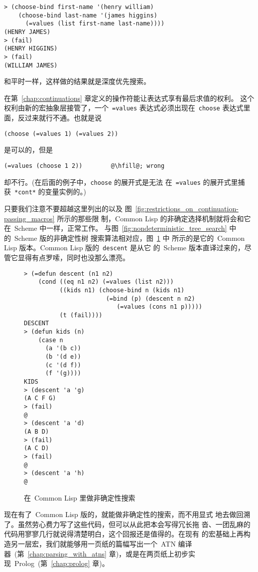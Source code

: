 \begin{lstlisting}
> (choose-bind first-name '(henry william)
    (choose-bind last-name '(james higgins)
      (=values (list first-name last-name))))
(HENRY JAMES)
> (fail)
(HENRY HIGGINS)
> (fail)
(WILLIAM JAMES)
\end{lstlisting}
和平时一样，这样做的结果就是深度优先搜索。

在第~\ref{chap:continuations} 章定义的操作符能让表达式享有最后求值的权利。
这个权利由新的宏抽象层接管了，一个~\texttt{=values} 表达式必须出现在~\texttt{choose} 表达式里面，反过来就行不通。也就是说
\begin{lstlisting}
(choose (=values 1) (=values 2))
\end{lstlisting}
是可以的，但是
\begin{lstlisting}[escapechar=\@]
(=values (choose 1 2))        @\hfill@; wrong
\end{lstlisting}
却不行。(在后面的例子中，\texttt{choose} 的展开式是无法
在~\texttt{=values} 的展开式里捕获~\texttt{*cont*} 的变量实例的。)

只要我们注意不要超越这里列出的以及
图~\ref{fig:restrictions_on_continuation-passing_macros} 所示的那些限
制，Common Lisp 的非确定选择机制就将会和它在~Scheme 中一样，正常工作。
与图~\ref{fig:nondeterministic_tree_search} 中的~Scheme 版的非确定性树
搜索算法相对应，图~\ref{fig:nondeterministic_search_in_common_lisp} 中
所示的是它的~Common Lisp 版本。Common Lisp 版的~\texttt{descent} 是从它
的~Scheme 版本直译过来的，尽管它显得有点罗嗦，同时也没那么漂亮。

\begin{figure}
\begin{lstlisting}
> (=defun descent (n1 n2)
    (cond ((eq n1 n2) (=values (list n2)))
          ((kids n1) (choose-bind n (kids n1)
                       (=bind (p) (descent n n2)
                          (=values (cons n1 p)))))
          (t (fail))))
DESCENT
> (defun kids (n)
    (case n
      (a '(b c))
      (b '(d e))
      (c '(d f))
      (f '(g))))
KIDS
> (descent 'a 'g)
(A C F G)
> (fail)
@
> (descent 'a 'd)
(A B D)
> (fail)
(A C D)
> (fail)
@
> (descent 'a 'h)
@
\end{lstlisting}
\caption{在~Common Lisp 里做非确定性搜索}
\label{fig:nondeterministic_search_in_common_lisp}
\end{figure}

现在有了~Common Lisp 版的\utility，就能做非确定性的搜索，而不用显式
地去做回溯了。虽然劳心费力写了这些代码，但可以从此把本会写得冗长拖
沓、一团乱麻的代码用寥寥几行就说得清楚明白，这个回报还是值得的。在现有
的宏基础上再构造另一层宏，我们就能够用一页纸的篇幅写出一个~ATN 编译
器~(第~\ref{chap:parsing_with_atns} 章)，或是在两页纸上初步实
现~Prolog~(第~\ref{chap:prolog} 章)。

